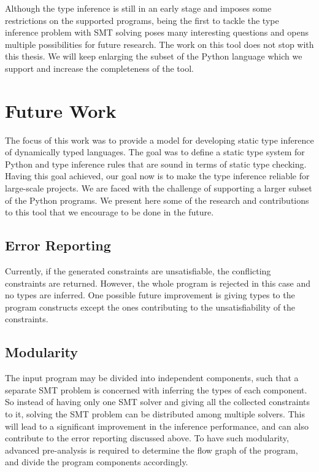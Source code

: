 Although the type inference is still in an early stage and imposes some restrictions on the supported programs, being the first to tackle the type inference problem with SMT solving poses many interesting questions and opens multiple possibilities for future research. The work on this tool does not stop with this thesis. We will keep enlarging the subset of the Python language which we support and increase the completeness of the tool.

\section{Future Work}
The focus of this work was to provide a model for developing static type inference of dynamically typed languages. The goal was to define a static type system for Python and type inference rules that are sound in terms of static type checking. Having this goal achieved, our goal now is to make the type inference reliable for large-scale projects. We are faced with the challenge of supporting a larger subset of the Python programs. We present here some of the research and contributions to this tool that we encourage to be done in the future.

\subsection{Error Reporting}
Currently, if the generated constraints are unsatisfiable, the conflicting constraints are returned. However, the whole program is rejected in this case and no types are inferred. One possible future improvement is giving types to the program constructs except the ones contributing to the unsatisfiability of the constraints.
\subsection{Modularity}
The input program may be divided into independent components, such that a separate SMT problem is concerned with inferring the types of each component. So instead of having only one SMT solver and giving all the collected constraints to it, solving the SMT problem can be distributed among multiple solvers. This will lead to a significant improvement in the inference performance, and can also contribute to the error reporting discussed above. To have such modularity, advanced pre-analysis is required to determine the flow graph of the program, and divide the program components accordingly.
